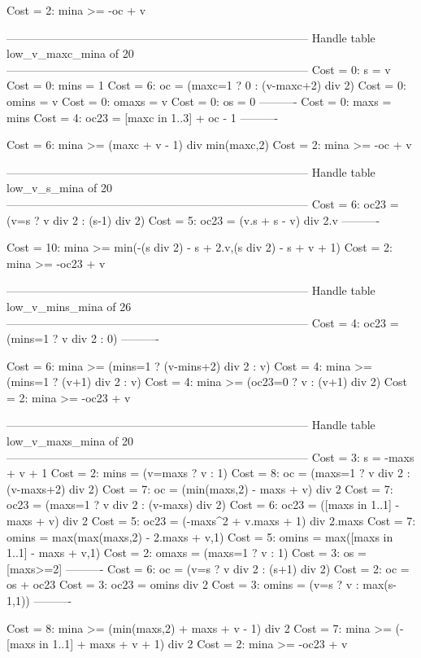 Cost =  2:  mina >= -oc + v

--------------------------------------------------------------------------------
Handle table low_v_maxc_mina of 20
--------------------------------------------------------------------------------
Cost =  0:  s     = v
Cost =  0:  mins  = 1
Cost =  6:  oc    = (maxc=1 ? 0 : (v-maxc+2) div 2)
Cost =  0:  omins = v
Cost =  0:  omaxs = v
Cost =  0:  os    = 0
----------
Cost =  0:  maxs  = mins
Cost =  4:  oc23  = [maxc in 1..3] + oc - 1
----------

Cost =  6:  mina >= (maxc + v - 1) div min(maxc,2)
Cost =  2:  mina >= -oc + v

--------------------------------------------------------------------------------
Handle table low_v_s_mina of 20
--------------------------------------------------------------------------------
Cost =  6:  oc23 = (v=s ? v div 2 : (s-1) div 2)
Cost =  5:  oc23 = (v.s + s - v) div 2.v
----------

Cost = 10:  mina >= min(-(s div 2) - s + 2.v,(s div 2) - s + v + 1)
Cost =  2:  mina >= -oc23 + v

--------------------------------------------------------------------------------
Handle table low_v_mins_mina of 26
--------------------------------------------------------------------------------
Cost =  4:  oc23 = (mins=1 ? v div 2 : 0)
----------

Cost =  6:  mina >= (mins=1 ? (v-mins+2) div 2 : v)
Cost =  4:  mina >= (mins=1 ? (v+1) div 2 : v)
Cost =  4:  mina >= (oc23=0 ? v : (v+1) div 2)
Cost =  2:  mina >= -oc23 + v

--------------------------------------------------------------------------------
Handle table low_v_maxs_mina of 20
--------------------------------------------------------------------------------
Cost =  3:  s     = -maxs + v + 1
Cost =  2:  mins  = (v=maxs ? v : 1)
Cost =  8:  oc    = (maxs=1 ? v div 2 : (v-maxs+2) div 2)
Cost =  7:  oc    = (min(maxs,2) - maxs + v) div 2
Cost =  7:  oc23  = (maxs=1 ? v div 2 : (v-maxs) div 2)
Cost =  6:  oc23  = ([maxs in 1..1] - maxs + v) div 2
Cost =  5:  oc23  = (-maxs^2 + v.maxs + 1) div 2.maxs
Cost =  7:  omins = max(max(maxs,2) - 2.maxs + v,1)
Cost =  5:  omins = max([maxs in 1..1] - maxs + v,1)
Cost =  2:  omaxs = (maxs=1 ? v : 1)
Cost =  3:  os    = [maxs>=2]
----------
Cost =  6:  oc    = (v=s ? v div 2 : (s+1) div 2)
Cost =  2:  oc    = os + oc23
Cost =  3:  oc23  = omins div 2
Cost =  3:  omins = (v=s ? v : max(s-1,1))
----------

Cost =  8:  mina >= (min(maxs,2) + maxs + v - 1) div 2
Cost =  7:  mina >= (-[maxs in 1..1] + maxs + v + 1) div 2
Cost =  2:  mina >= -oc23 + v

